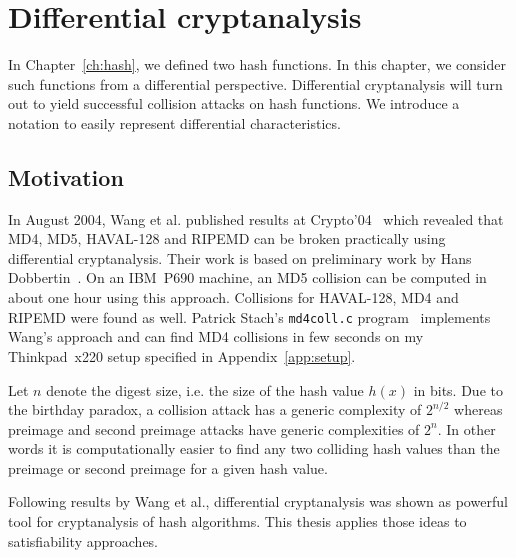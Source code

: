 \renewcommand*\chappic{img/diff-crypt.pdf}
\renewcommand*\chapquote{Just because it's automatic doesn't mean it works.}
\renewcommand*\chapquotesrc{Daniel J. Bernstein}
%
\chapter{Differential cryptanalysis}
\label{ch:dc}
%
In Chapter~\ref{ch:hash}, we defined two hash functions. In this chapter,
we consider such functions from a differential perspective. Differential
cryptanalysis will turn out to yield successful collision attacks on hash
functions. We introduce a notation to easily represent differential
characteristics.

\section{Motivation}
\label{sec:dc-motivation}
%
In August 2004, Wang et al. published results at Crypto'04~\cite{wang2004} which revealed
that MD4, MD5, HAVAL-128 and RIPEMD can be broken practically using differential cryptanalysis.
Their work is based on preliminary work by Hans Dobbertin~\cite{Dobbertin1998}.
On an IBM~P690 machine, an MD5 collision can be computed in about one hour using this approach.
Collisions for HAVAL-128, MD4 and RIPEMD were found as well. Patrick Stach's \texttt{md4coll.c}
program~\cite{md4coll} implements Wang's approach and can find MD4 collisions in few seconds
on my Thinkpad~x220 setup specified in Appendix~\ref{app:setup}.

Let $n$ denote the digest size, i.e. the size of the hash value $h(x)$ in bits.
Due to the birthday paradox, a collision attack has a generic complexity of $2^{n/2}$
whereas preimage and second preimage attacks have generic complexities of $2^n$.
In other words it is computationally easier to find any two colliding hash values
than the preimage or second preimage for a given hash value.

Following results by Wang et al., differential cryptanalysis was shown as
powerful tool for cryptanalysis of hash algorithms. This thesis applies those
ideas to satisfiability approaches.

